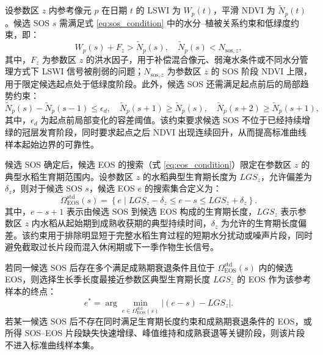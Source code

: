 设参数区 \(z\) 内参考像元 \(p\) 在日期 \(t\) 的 LSWI 为 \(W_p(t)\)，平滑 NDVI 为 \(\widetilde{N}_p(t)\)。候选 SOS \(s\) 需满足式 \ref{eq:sos_condition} 中的水分--植被关系约束和低绿度约束，即：
\begin{equation}
    W_p(s)+F_z>\widetilde{N}_p(s), \quad
    \widetilde{N}_p(s)<N_{\mathrm{sos},z},
    \label{eq:std_sos_water_lowgreen}
\end{equation}
其中，\(F_z\) 为参数区 \(z\) 的洪水因子，用于补偿混合像元、弱淹水条件或不同水分管理方式下 LSWI 信号被削弱的问题；\(N_{\mathrm{sos},z}\) 为参数区 \(z\) 的 SOS 阶段 NDVI 上限，用于限定候选起点处于低绿度阶段。此外，候选 SOS 还需满足起点前后的局部趋势约束：
\begin{equation}
    \widetilde{N}_p(s)-\widetilde{N}_p(s-1)\leq \epsilon_d,
    \quad
    \widetilde{N}_p(s+1)\geq \widetilde{N}_p(s),
    \quad
    \widetilde{N}_p(s+2)\geq \widetilde{N}_p(s+1),
    \label{eq:std_sos_trend}
\end{equation}
其中，\(\epsilon_d\) 为起点前局部变化的容差阈值。该约束要求候选 SOS 不位于已经持续增绿的冠层发育阶段，同时要求起点之后 NDVI 出现连续回升，从而提高标准曲线样本起始边界的可靠性。

候选 SOS 确定后，候选 EOS 的搜索（式 \ref{eq:eos_condition}）限定在参数区 \(z\) 的典型水稻生育期范围内。设参数区 \(z\) 的水稻典型生育期长度为 \(LGS_z\)，允许偏差为 \(\delta_z\)，则对于候选 SOS \(s\)，候选 EOS \(e\) 的搜索集合定义为：
\begin{equation}
    \Omega^{\mathrm{std}}_{\mathrm{EOS}}(s)=
    \left\{
    e \mid LGS_z-\delta_z \leq e-s \leq LGS_z+\delta_z
    \right\}.
    \label{eq:std_eos_window}
\end{equation}
其中，\(e-s+1\) 表示由候选 SOS 到候选 EOS 构成的生育期长度，\(LGS_z\) 表示参数区 \(z\) 内水稻从起始期到成熟收获期的典型持续时间，\(\delta_z\) 为允许的生育期长度偏差。该约束用于排除明显短于完整水稻生育过程的短期水分扰动或噪声片段，同时避免截取过长片段而混入休闲期或下一季作物生长信号。

若同一候选 SOS 后存在多个满足成熟期衰退条件且位于 \(\Omega^{\mathrm{std}}_{\mathrm{EOS}}(s)\) 内的候选 EOS，则选择生长季长度最接近参数区典型生育期长度 \(LGS_z\) 的 EOS 作为该参考样本的终点：
\begin{equation}
    e^{*}=
    \arg\min_{e\in\Omega^{\mathrm{std}}_{\mathrm{EOS}}(s)}
    \left| (e-s)-LGS_z \right|.
    \label{eq:std_eos_selection}
\end{equation}
若某一候选 SOS 后不存在同时满足生育期长度约束和成熟期衰退条件的 EOS，或所得 SOS--EOS 片段缺失快速增绿、峰值维持和成熟衰退等关键阶段，则该片段不进入标准曲线样本集。

